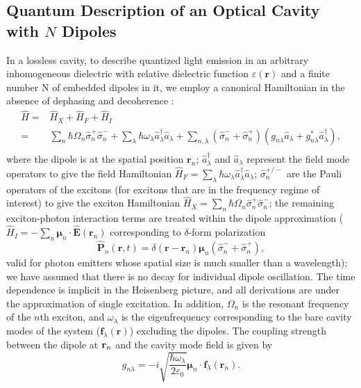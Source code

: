 \subsection{Quantum Description of an Optical Cavity with $N$ Dipoles}
In a lossless cavity, to describe quantized light emission in an arbitrary inhomogeneous dielectric with relative dielectric function $\varepsilon(\mathbf{r})$ and a finite number N of embedded
dipoles in it, we employ a canonical Hamiltonian in the absence of dephasing and decoherence \cite{Vats2002,Wubs2004}:
\begin{equation}
\label{eq:h}
\begin{split}
 \hat{H} =& \hat{H}_{X}+\hat{H}_F+\hat{H}_I\\
=& \sum_n\hbar \Omega_n \hat{\sigma}_n^+\hat{\sigma}_n^-+
\sum_\lambda\hbar \omega_\lambda
\hat{a}_\lambda^\dagger\hat{a}_\lambda +\sum_{n,\lambda}(
\hat{\sigma}_n^- + \hat{\sigma}_n^+)(g_{n\lambda}
\hat{a}_\lambda+g_{n\lambda}^*\hat{a}_\lambda^\dagger),\\
\end{split}
\end{equation}
where the dipole is at the spatial position $\mathbf{r}_n$; $\hat{a}_{\lambda}^{\dagger}$ and $\hat{a}_{\lambda}$ represent the field mode operators to give the field Hamiltonian $\hat{H}_F=\sum_\lambda\hbar \omega_\lambda
\hat{a}_\lambda^\dagger\hat{a}_\lambda$; $\hat{\sigma}^{+/-}_n$ are the Pauli operators of the excitons
(for excitons that are in the frequency regime of interest) to give the exciton Hamiltonian $\hat{H}_{X}=\sum_n\hbar \Omega_n \hat{\sigma}_n^+\hat{\sigma}_n^-$;
the remaining exciton-photon interaction terms are treated within the dipole approximation
($\hat{H}_I=-\sum_n{\bm{\mu} _n \cdot \hat{\mathbf{E}}(\mathbf{r}_n)}$ corresponding to $\delta$-form polarization
\begin{equation}\label{eq:P}
\hat{\mathbf{P}}_n(\mathbf{r},t)=\delta(\mathbf{r}-\mathbf{r}_n)\bm{\mu} _n(\hat{\sigma}_n^- + \hat{\sigma}_n^+),
\end{equation}
valid for photon emitters whose spatial size is much smaller than a wavelength); we have assumed that there is no decay for individual dipole oscillation. The time dependence is implicit in the Heisenberg picture, and all derivations are under the approximation of single excitation.
In addition, $\Omega_n$ is the resonant frequency of the $n$th exciton, and $\omega_\lambda$ is the eigenfrequency
corresponding to the bare cavity modes of the system ($\mathbf{f}_\lambda(\mathbf{r})$) excluding the dipoles. The coupling strength between the dipole at $\mathbf{r}_n$ and the cavity mode field is given by~\cite{Wubs2004}
\begin{equation}
g_{n\lambda}=-i\sqrt{\frac{\hbar\omega_\lambda}{2 \varepsilon_0}}\boldsymbol{\mu}_n\cdot \mathbf{f}_\lambda(\mathbf{r}_n).
\end{equation}

